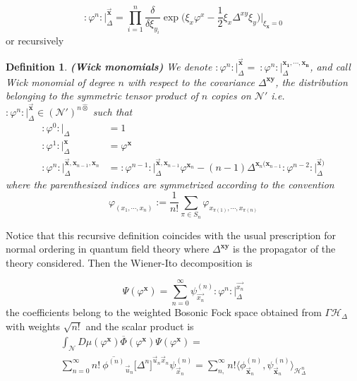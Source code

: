 \documentclass[12pt]{article}%
\newtheorem{definition}{Definition}%
\begin{document}
    \begin{equation}
    \label{eq:wickMonomialsGenerator}
    :\varphi^n:\lvert_\Delta^{\vec{\mathbf{x}}}=
    \prod_{i=1}^n\frac{\delta}{\delta \xi_{y_i}}
    \exp{\big(\xi_x\varphi^x-\frac12\xi_x\Delta^{xy}\xi_y\big)} \lvert_{\xi_{\mathbf{x}}=0}
    \end{equation}
    or recursively 
\begin{definition}
    \label{def:wickMonomials}{\bf (Wick monomials)} 
    We denote $:\varphi^n:\lvert_\Delta^{\vec{\mathbf{x}}}=\ :\varphi^n:\lvert_\Delta^{\mathbf{x_1,\cdots,x_n}}$, and call Wick monomial of degree $n$ with respect to the covariance $\Delta^{\mathbf{xy}}$, the distribution belonging to the symmetric tensor product of $n$ copies on $\mathcal{N}'$ i.e. $:\varphi^n:\lvert_\Delta^{\vec{\mathbf{x}}}\in(\mathcal{N}')^{n\hat{\otimes}}$ such that
    \begin{align}
        :\varphi^0:\lvert_\Delta&=1\nonumber\\
        :\varphi^1:\lvert_\Delta^{\mathbf{x}}&=\varphi^{\mathbf{x}}\nonumber\\
        :\varphi^n:\lvert_\Delta^{\vec{\mathbf{x}},{\mathbf{x}}_{n-1},{\mathbf{x}}_n}&=
        :\varphi^{n-1}:\lvert_\Delta^{\vec{{\mathbf{x}}},{\mathbf{x}}_{n-1}}\varphi^{{\mathbf{x}}_n}-(n-1)\Delta^{\mathbf{x}_n(\mathbf{x}_{n-1}}:\varphi^{n-2}:\lvert_\Delta^{\vec{\mathbf{x}})}
        \label{eqn:wickPowers}
    \end{align}
    where the parenthesized indices are symmetrized according to the convention 
    \begin{equation}
    \label{eq:symmetrization}
    \varphi_{(x_1,\cdots,x_n)}:=\frac{1}{n!}\sum_{\pi\in S_n}\varphi_{x_{\pi(1)},\cdots,x_{\pi(n)}}
    \end{equation}
\end{definition}
Notice that this recursive definition coincides with the usual prescription for normal ordering in quantum field theory where $\Delta^{\mathbf{xy}}$ is the propagator of the theory considered.  Then the Wiener-Ito decomposition is 

$$\Psi(\varphi^\mathbf{x})=\sum_{n=0}^\infty \psi^{(n)}_{\vec{x_n}}:\varphi^n:\lvert_\Delta^{\vec{{x}_n}}$$
 the coefficients belong to the weighted Bosonic Fock space obtained from $\Gamma\mathcal{H}_\Delta$ with weights $\sqrt{n!}$ and the scalar product is 
\begin{multline}
    \label{eq:complexchaosprod}
    \int_{\mathcal{N}}D\mu(\varphi^\mathbf{x})\overline{\Phi}(\varphi^\mathbf{x})\Psi(\varphi^\mathbf{x})
    = \\   \sum_{n=0}^\infty n!\ \overline{\phi^{(n)}}_{\vec{u}_n}\big[\Delta^n\big]^{\vec{u}_n\vec{x}_n}  \psi^{(n)}_{\vec{x}_n}
    = 
    \sum_{n,}^\infty n! \big\langle\phi^{(n)}_{\vec{\mathbf{x}}_n},\psi^{(n)}_{\vec{\mathbf{x}}_n}\big\rangle_{\mathcal{H}^{n}_\Delta}
    \end{multline}
\end{document}
